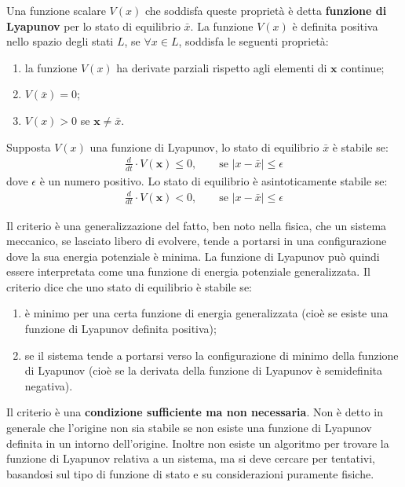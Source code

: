 Una funzione scalare $V(x)$ che soddisfa queste proprietà è detta \textbf{funzione di Lyapunov} per lo stato di equilibrio $\bar{x}$.
La funzione $V(x)$ è definita positiva nello spazio degli stati $L$, se $\forall x \in L$, soddisfa le seguenti proprietà:
\begin{enumerate}
    \item la funzione $V(x)$ ha derivate parziali rispetto agli elementi di $\mathbf{x}$ continue;
    \item $V(\bar{x})=0$;
    \item $V(x)>0$ se $\mathbf{x} \neq \bar{x}$.
\end{enumerate}

Supposta $V(x)$ una funzione di Lyapunov, lo stato di equilibrio $\bar{x}$ è stabile se:
\begin{align*}
    \frac{d}{dt} \cdot V(\mathbf{x}) \leq 0, \qquad \text{se } \left|x - \bar{x} \right| \leq \epsilon
\end{align*}
dove $\epsilon$ è un numero positivo. Lo stato di equilibrio è asintoticamente stabile se:
\begin{align*}
    \frac{d}{dt} \cdot V(\mathbf{x}) < 0, \qquad \text{se } \left|x - \bar{x} \right| \leq \epsilon
\end{align*}

Il criterio è una generalizzazione del fatto, ben noto nella fisica, che un sistema meccanico, se lasciato libero di evolvere, tende a portarsi in una configurazione dove la sua energia potenziale è minima. La funzione di Lyapunov può quindi essere interpretata come una funzione di energia potenziale generalizzata. Il criterio dice che uno stato di equilibrio è stabile se:
\begin{enumerate}
    \item è minimo per una certa funzione di energia generalizzata (cioè se esiste una funzione di Lyapunov definita positiva);
    \item se il sistema tende a portarsi verso la configurazione di minimo della funzione di Lyapunov (cioè se la derivata della funzione di Lyapunov è semidefinita negativa).
\end{enumerate}
Il criterio è una \textbf{condizione sufficiente ma non necessaria}. Non è detto in generale che l'origine non sia stabile se non esiste una funzione di Lyapunov definita in un intorno dell'origine. Inoltre non esiste un algoritmo per trovare la funzione di Lyapunov relativa a un sistema, ma si deve cercare per tentativi, basandosi sul tipo di funzione di stato e su considerazioni puramente fisiche.

